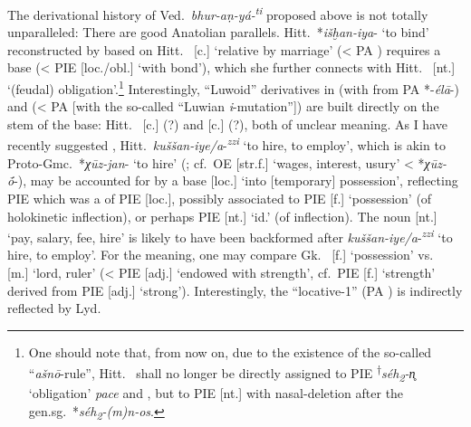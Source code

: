 \documentclass[output=paper,colorlinks,citecolor=brown]{langscibook}
\begin{document}
\largerpage
The derivational history of Ved.\ \textit{bhur-aṇ-yá-\textsuperscript{ti}}  proposed above is not totally unparalleled: There are good Anatolian parallels. Hitt.\ *\textit{išḫan-iya}-  ‘to bind’ reconstructed by \citet[286--287]{Rieken1999} based on Hitt.\  [c.] ‘relative by marriage’ (< PA ) requires a base  (< PIE  [loc./obl.] ‘with bond’), which she further connects with Hitt.\  [nt.] ‘(feudal) obligation’.\footnote{One should note that, from now on, due to the existence of the so-called  “\textit{ašnō}-rule”, Hitt.\  shall no longer be directly assigned to PIE \textsuperscript{†}\textit{séh\textsubscript{2}}\textit{-}{\textit{n̥}} ‘obligation’ \textit{pace} \citet[287]{Rieken1999} and \citet[691]{Kloekhorst2008}, but to PIE  [nt.] with nasal-deletion after the gen.sg.\ *\textit{séh\textsubscript{2}-(m)n-os}.}  Interestingly, “Luwoid” derivatives in  (with  from PA *\mbox{-\textit{élā}-)}  and  (< PA  [with the so-called “Luwian \textit{i}-mutation”])  are  built directly on the stem of the base: Hitt.\  [c.] (?) and  [c.] (?), both of unclear meaning. As I have recently suggested \citep[175]{Garnier2022b}, Hitt.\ \textit{kuššan-iye/a}-\textit{\textsuperscript{zzi}}  ‘to hire, to employ’, which is akin to Proto-Gmc.\  *\textit{χūz-jan}-   ‘to hire’ (\citealt[498]{Kloekhorst2008}; cf.\ OE  [str.f.] ‘wages, interest, usury’ <   *\textit{χūz-ṓ}-), may be accounted for by a base   [loc.] ‘into [temporary] possession’, reflecting PIE  which was a  of PIE  [loc.], possibly associated to PIE  [f.] ‘possession’ (of holokinetic inflection), or perhaps PIE  [nt.] ‘id.’ (of  inflection). The noun  [nt.] ‘pay, salary, fee, hire’ is likely to have been backformed after \textit{kuššan-iye/a}-\textit{\textsuperscript{zzi}}   ‘to hire, to employ’. For the meaning, one may compare Gk.\  [f.] ‘possession’ vs.\   [m.] ‘lord, ruler’ (< PIE  [adj.] ‘endowed with strength’, cf.\ PIE  [f.] ‘strength’ derived from PIE  [adj.] ‘strong’). Interestingly, the “locative-1” (PA ) is indirectly reflected by Lyd.\ 
\end{document}
